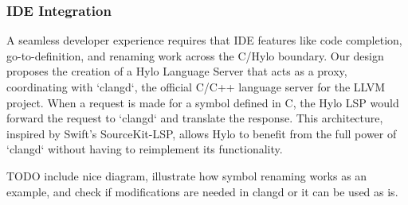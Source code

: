 \subsubsection{IDE Integration}

A seamless developer experience requires that IDE features like code completion, go-to-definition, and renaming work across the C/Hylo boundary. Our design proposes the creation of a Hylo Language Server that acts as a proxy, coordinating with `clangd`, the official C/C++ language server for the LLVM project. When a request is made for a symbol defined in C, the Hylo LSP would forward the request to `clangd` and translate the response. This architecture, inspired by Swift's SourceKit-LSP, allows Hylo to benefit from the full power of `clangd` without having to reimplement its functionality.

TODO include nice diagram, illustrate how symbol renaming works as an example, and check if modifications are needed in clangd or it can be used as is.

